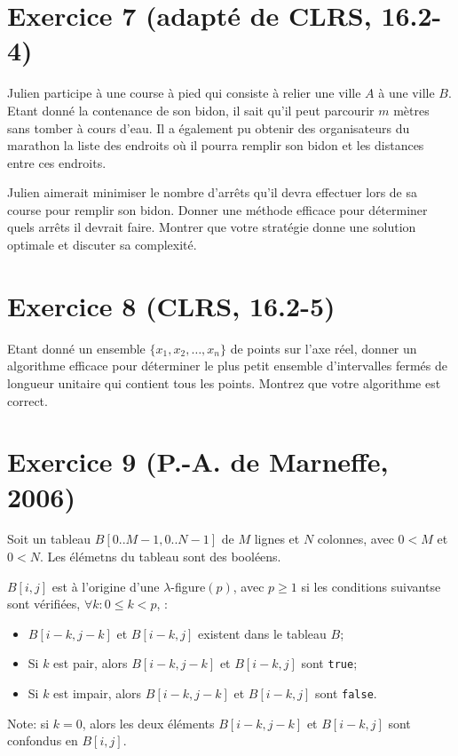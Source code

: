 \documentclass[a4paper,10pt]{article}
\begin{document}
\section*{Exercice 7 {\small (adapté de CLRS, 16.2-4)}}

Julien participe à une course à pied qui consiste à relier une ville
$A$ à une ville $B$. Etant donné la contenance de son bidon, il sait
qu'il peut parcourir $m$ mètres sans tomber à cours d'eau. Il a
également pu obtenir des organisateurs du marathon la liste des
endroits où il pourra remplir son bidon et les distances entre ces
endroits.

Julien aimerait minimiser le nombre d'arrêts qu'il devra effectuer
lors de sa course pour remplir son bidon. Donner une méthode efficace
pour déterminer quels arrêts il devrait faire. Montrer que votre
stratégie donne une solution optimale et discuter sa complexité.

\section*{Exercice 8 {\small (CLRS, 16.2-5)}}

Etant donné un ensemble $\{x_1,x_2,\ldots,x_n\}$ de points sur l'axe
réel, donner un algorithme efficace pour déterminer le plus petit
ensemble d'intervalles fermés de longueur unitaire qui contient tous
les points. Montrez que votre algorithme est correct.

\section*{Exercice 9 {\small (P.-A. de Marneffe, 2006)}}

Soit un tableau $B[0..M-1, 0..N-1]$ de $M$ lignes et $N$ colonnes, avec $0<M$ et
$0<N$. Les élémetns du tableau sont des booléens.

$B[i,j]$ est à l'origine d'une $\lambda$-figure$(p)$, avec $p\geq 1$ si les conditions suivantse sont vérifiées, $\forall k : 0 \leq k < p$, :

\begin{itemize}
\item $B[i-k,j-k]$ et $B[i-k,j]$ existent dans le tableau $B$;
\item Si $k$ est pair, alors $B[i-k,j-k]$ et $B[i-k,j]$ sont \texttt{true};
\item Si $k$ est impair, alors $B[i-k,j-k]$ et $B[i-k,j]$ sont \texttt{false}.
\end{itemize}

Note: si $k=0$, alors les deux éléments $B[i-k,j-k]$ et $B[i-k,j]$ sont confondus en $B[i,j]$.
\end{document}
